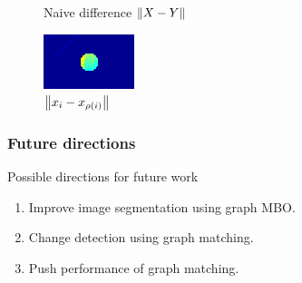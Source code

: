 \documentclass{beamer}
\begin{document}
\begin{frame}
\begin{figure}
\begin{minipage}[b]{0.40\linewidth}
      \caption{Naive difference $\left\lVert X-Y\right\rVert$}
    \end{minipage}
    \hfill
    \begin{minipage}[b]{0.40\linewidth}
      \centering
      \includegraphics[width=\textwidth]{./Images/GraphMatch/normMap.png}
      \caption{$\left\lVert x_i - x_{\rho(i)}\right\rVert$}
    \end{minipage}
  \end{figure}
\end{frame}


\begin{frame}
  \frametitle{Future directions}
  Possible directions for future work
  \begin{enumerate}
  \item Improve image segmentation using graph MBO.
  \item Change detection using graph matching.
  \item Push performance of graph matching.
  \end{enumerate}
\end{frame}

\end{document}
